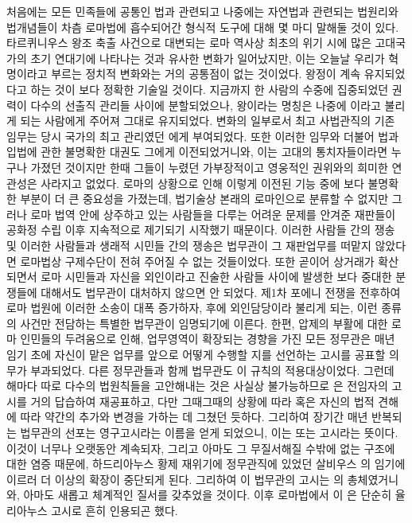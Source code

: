 처음에는 모든 민족들에 공통인 법과 관련되고 나중에는 자연법과 관련되는
법원리와 법개념들이 차츰 로마법에 흡수되어간 형식적 도구에 대해
몇 마디 말해둘 것이 있다.
타르퀴니우스 왕조 축출 사건으로 대변되는 로마 역사상 최초의 위기 시에
많은 고대국가의 초기 연대기에 나타나는 것과 유사한 변화가 일어났지만,
이는 오늘날 우리가 혁명이라고 부르는 정치적 변화와는 거의 공통점이 없는
것이었다.
왕정이 계속 유지되었다고 하는 것이 보다 정확한 기술일 것이다.
지금까지 한 사람의 수중에 집중되었던 권력이
다수의 선출직 관리들 사이에 분할되었으나,
왕이라는 명칭은 나중에
이라고
불리게 되는 사람에게 주어져 그대로 유지되었다.
변화의 일부로서 최고 사법관직의 기존 임무는 당시 국가의 최고 관리였던
에게 부여되었다. 또한
이러한 임무와 더불어
법과 입법에 관한 불명확한 대권도 그에게 이전되었거니와,
이는 고대의 통치자들이라면 누구나 가졌던 것이지만
한때 그들이 누렸던 가부장적이고 영웅적인 권위와의 희미한 연관성은
사라지고 없었다.
로마의 상황으로 인해 이렇게 이전된 기능 중에 보다 불명확한 부분이
더 큰 중요성을 가졌는데,
법기술상 본래의 로마인으로 분류할 수 없지만
그러나 로마 법역 안에 상주하고 있는 사람들을 다루는 어려운 문제를
안겨준 재판들이
공화정 수립 이후
지속적으로 제기되기 시작했기 때문이다.
이러한 사람들 간의 쟁송 및 이러한 사람들과 생래적 시민들 간의 쟁송은
법무관이 그 재판업무를 떠맡지 않았다면
로마법상 구제수단이 전혀 주어질 수 없는 것들이었다.
또한 곧이어 상거래가 확산되면서 로마 시민들과 자신을 외인이라고 진술한 사람들 사이에 발생한
보다 중대한 분쟁들에 대해서도 법무관이 대처하지 않으면 안 되었다.
제1차 포에니 전쟁을 전후하여 로마 법원에 이러한 소송이 대폭 증가하자,
후에 외인담당이라 불리게 되는,
이런 종류의 사건만 전담하는 특별한 법무관이 임명되기에 이른다.
한편, 압제의 부활에 대한 로마 인민들의 두려움으로 인해,
업무영역이 확장되는 경향을 가진 모든 정무관은
매년 임기 초에
자신이 맡은 업무를 앞으로 어떻게 수행할 지를 선언하는
고시를 공표할 의무가 부과되었다.
다른 정무관들과 함께 법무관도 이 규칙의 적용대상이었다.
그런데 해마다 따로 다수의 법원칙들을 고안해내는 것은 사실상 불가능하므로
은 전임자의 고시를 거의 답습하여 재공표하고,
다만 그때그때의 상황에 따라 혹은 자신의 법적 견해에 따라
약간의 추가와 변경을 가하는 데 그쳤던 듯하다.
그리하여 장기간 매년 반복되는 법무관의 선포는
영구고시라는 이름을 얻게 되었으니,
이는  또는  고시라는 뜻이다.
이것이 너무나 오랫동안 계속되자,
그리고 아마도 그 무질서해질 수밖에 없는 구조에 대한 염증 때문에,
하드리아누스 황제 재위기에 정무관직에 있었던
살비우스 의 임기에 이르러
더 이상의 확장이 중단되게 된다.
그리하여 이 법무관의 고시는 의 총체였거니와,
아마도 새롭고 체계적인 질서를 갖추었을 것이다.
이후 로마법에서 이 은 단순히
율리아누스 고시로 흔히 인용되곤 했다.

